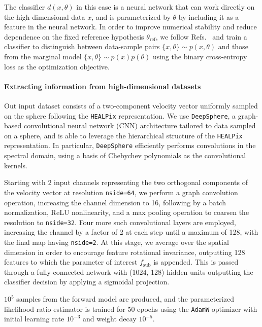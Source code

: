 \documentclass[]{article}
\begin{document}
The classifier $d(x, \theta)$ in this case is a neural network that can work directly on the high-dimensional data $x$, and is parameterized by $\theta$ by including it as a feature in the neural network. In order to improve numerical stability and reduce dependence on the fixed reference hypothesis $\theta_\mathrm{ref}$, we follow Refs.~\cite{} and train a classifier to distinguish between data-sample pairs $\{x, \theta\} \sim p(x,\theta)$ and those from the marginal model $\{x, \theta\} \sim p(x)p(\theta)$ using the binary cross-entropy loss as the optimization objective. 

\paragraph{Extracting information from high-dimensional datasets} Out input dataset consists of a two-component velocity vector uniformly sampled on the sphere following the \texttt{HEALPix} representation. We use \texttt{DeepSphere}, a graph-based convolutional neural network (CNN) architecture tailored to data sampled on a sphere, and is able to leverage the hierarchical structure of the \texttt{HEALPix} representation. In particular, \texttt{DeepSphere} efficiently performs convolutions in the spectral domain, using a basis of Chebychev polynomials as the convolutional kernels. 

Starting with 2 input channels representing the two orthogonal components of the velocity vector at resolution \texttt{nside=64}, we perform a graph convolution operation, increasing the channel dimension to 16, following by a batch normalization, ReLU nonlinearity, and a max pooling operation to coarsen the resolution to \texttt{nside=32}. Four more such convolutional layers are employed, increasing the channel by a factor of 2 at each step until a maximum of 128, with the final map having \texttt{nside=2}. At this stage, we average over the spatial dimension in order to encourage feature rotational invariance, outputting 128 features to which the parameter of interest $f_\mathrm{sub}$ is appended. This is passed through a fully-connected network with (1024, 128) hidden units outputting the classifier decision by applying a sigmoidal projection.

$10^5$ samples from the forward model are produced, and the parameterized likelihood-ratio estimator is trained for 50 epochs using the \texttt{AdamW} optimizer with initial learning rate $10^{-3}$ and weight decay $10^{-5}$.

\end{document}
